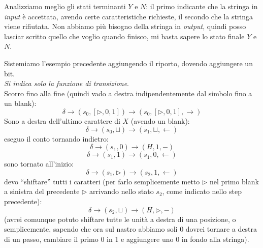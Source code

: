 Analizziamo meglio gli stati terminanti $Y$ e $N$: il primo indicante che la
stringa in \textit{input} è accettata, avendo certe caratteristiche richieste, il secondo
che la stringa viene rifiutata. Non abbiamo più bisogno della stringa in
\textit{output}, quindi posso lasciar scritto quello che voglio quando finisco, mi basta
sapere lo stato finale $Y$ e $N$.
\begin{esempio}
  Sistemiamo l'esempio precedente aggiungendo il riporto, dovendo aggiungere un
  bit. \\
 \textit{Si indica solo la funzione di transizione}.\\
  Scorro fino alla fine (quindi vado a destra indipendentemente dal simbolo fino
  a un blank):
  \[\delta\to(s_0,[\triangleright, 0,1])\to(s_0,[\triangleright, 0,1],
    \rightarrow)\]
  Sono a destra dell'ultimo carattere di $X$ (avendo un blank):
  \[\delta\to(s_0,\sqcup)\to(s_1,\sqcup,\leftarrow)\]
  eseguo il conto tornando indietro:
  \[\delta\to(s_1,0)\to(H,1,-)\]
  \[\delta\to(s_1,1)\to(s_1,0,\leftarrow)\]
  sono tornato all'inizio:
  \[\delta\to(s_1,\triangleright)\to(s_2,1,\leftarrow)\]
  devo ``shiftare'' tutti i caratteri (per farlo semplicemente metto
  $\triangleright$ nel primo blank a sinistra del precedente $\triangleright$
  arrivando nello stato $s_2$, come indicato nello step precedente):
  \[\delta\to(s_2,\sqcup)\to(H,\triangleright,-)\]
  (avrei comunque potuto shiftare tutte le unità a destra di una posizione, o
  semplicemente, sapendo che ora sul nastro abbiamo soli 0 dovrei tornare a destra di
  un passo, cambiare il primo 0 in 1 e aggiungere uno 0 in fondo alla
  stringa).
\end{esempio}
